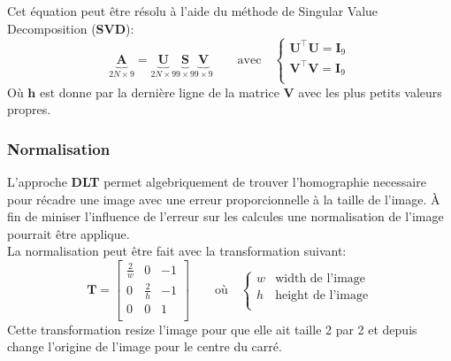 \documentclass[../5RO17_TP1.tex]{subfiles}
\begin{document}
Cet équation peut être résolu à l'aide du méthode de Singular Value Decomposition (\textbf{SVD}):
\begin{equation}
    \underbrace{\mathbf{A}}_{2N\times9}
    =
    \underbrace{\mathbf{U}}_{2N\times9} \underbrace{\mathbf{S}}_{9\times9} \underbrace{\mathbf{V}}_{9\times9}
    \qquad
    \text{avec}
    \quad
    \begin{cases}
        \mathbf{U}^{\intercal}\mathbf{U} = \mathbf{I}_{9}\\
        \mathbf{V}^{\intercal}\mathbf{V} = \mathbf{I}_{9}\\
    \end{cases}
\end{equation}
Où $\mathbf{h}$ est donne par la dernière ligne de la matrice $\mathbf{V}$ avec les plus petits valeurs propres.

\subsubsection{Normalisation}
\noindent L'approche \textbf{DLT} permet algebriquement de trouver l'homographie necessaire pour récadre une image avec une erreur proporcionnelle à la taille de l'image. À fin de miniser l'influence de l'erreur sur les calcules une normalisation de l'image pourrait être applique.\\

\noindent La normalisation peut être fait avec la transformation suivant:
\begin{equation}
    \mathbf{T}
    =
    \begin{bmatrix}
        \frac{2}{w} & 0 & -1\\
        0 & \frac{2}{h} & -1\\
        0 & 0 & 1\\
    \end{bmatrix}
    \qquad
    \text{où}
    \quad
    \begin{cases}
        w & \text{width de l'image}\\
        h & \text{height de l'image}\\
    \end{cases}
\end{equation}
\noindent Cette transformation resize l'image pour que elle ait taille 2 par 2 et depuis change l'origine de l'image pour le centre du carré.\\
\end{document}
